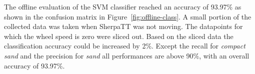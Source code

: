 \documentclass{article}
\begin{document}
The offline evaluation of the SVM classifier reached an accuracy of 93.97\% as shown in the confusion matrix in Figure~\ref{fig:offline-class}. A small portion of the collected data was taken when SherpaTT was not moving. The datapoints for which the wheel speed is zero were sliced out. Based on the sliced data the classification accuracy could be increased by 2\%.
Except the recall for \emph{compact sand} and the precision for \emph{sand} all performances are above 90\%, with an overall accuracy of 93.97\%.






\end{document}
